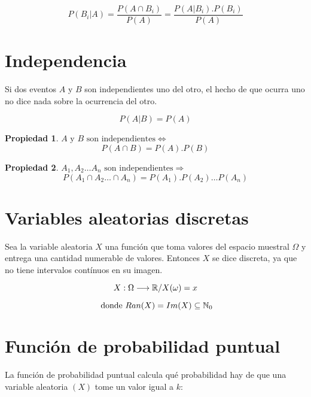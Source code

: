 \documentclass[a5paper,12pt,twoside]{book}
\newtheorem{prop}{{Propiedad}}[chapter]
\begin{document}
\begin{equation}
P(B_i|A)=\dfrac{P(A \cap B_i)}{P(A)}=\dfrac{P(A|B_i) . P(B_i)}{P(A)}
\end{equation}

\section{Independencia}

Si dos eventos $A$ y $B$ son independientes uno del otro, el hecho de que ocurra uno no dice nada sobre la ocurrencia del otro.

\begin{equation}
P(A|B)=P(A)
\end{equation}

\begin{prop}
$\textrm{$A$ y $B$ son independientes} \iff $
\begin{equation*}
P(A \cap B)=P(A).P(B)
\end{equation*}
\end{prop}

\begin{prop}
$\textrm{$A_1, A_2 \dots A_n$ son independientes} \Rightarrow $
\begin{equation*}
P(A_1 \cap A_2 \dots \cap A_n)=P(A_1).P(A_2) \dots P(A_n)
\end{equation*}
\end{prop}


\section{Variables aleatorias discretas}

Sea la variable aleatoria $X$ una función que toma valores del espacio muestral $\Omega$ y entrega una cantidad numerable de valores. Entonces $X$ se dice discreta, ya que no tiene intervalos contínuos en su imagen.

\begin{equation}
X: \Omega \longrightarrow \mathbb{R} / X(\omega) = x
\end{equation}

$$ \text{ donde } Ran(X)=Im(X) \subseteq \mathbb{N}_0 $$

\section{Función de probabilidad puntual}

La función de probabilidad puntual calcula qué probabilidad hay de que una variable aleatoria $(X)$ tome un valor igual a $k$:
\end{document}
